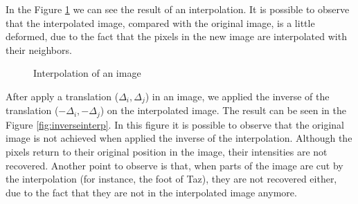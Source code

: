 \documentclass{article}
\begin{document}
	In the Figure \ref{fig:interp} we can see the result of an interpolation. It is possible to observe that the interpolated image, compared with the original image, is a little deformed, due to the fact that the pixels in the new image are interpolated with their neighbors.

	\begin{figure}[H]
		  \centering
		  \hspace{0.1cm}
		  \caption{Interpolation of an image}
		  \label{fig:interp}
	\end{figure}	

	After apply a translation ($\Delta_i,\Delta_j$) in an image, we applied the inverse of the translation ($-\Delta_i,-\Delta_j$) on the interpolated image. The result can be seen in the Figure \ref{fig:inverseinterp}. In this figure it is possible to observe that the original image is not achieved when applied the inverse of the interpolation. Although the pixels return to their original position in the image, their intensities are not recovered. Another point to observe is that, when parts of the image are cut by the interpolation (for instance, the foot of Taz), they are not recovered either, due to the fact that they are not in the interpolated image anymore.
\end{document}
